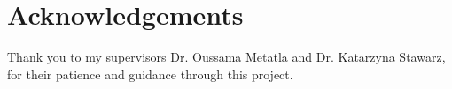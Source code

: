 
\section*{Acknowledgements}

Thank you to my supervisors Dr. Oussama Metatla and Dr. Katarzyna Stawarz, for their patience and guidance through this project.
